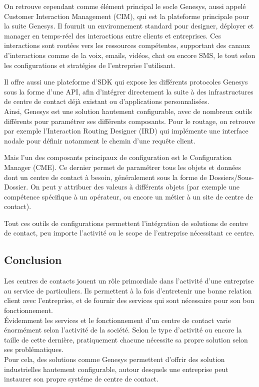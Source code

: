 \documentclass{rapport}
\begin{document}
On retrouve cependant comme élément principal le socle Genesys, aussi appelé Customer Interaction Management (CIM), qui est la plateforme principale pour la suite Genesys. Il fournit un environnement standard pour designer, déployer et manager en temps-réel des interactions entre clients et entreprises.
Ces interactions sont routées vers les ressources compétentes, supportant des canaux d'interactions comme de la voix, emails, vidéos, chat ou encore SMS, le tout selon les configurations et stratégies de l'entreprise l'utilisant.

Il offre aussi une plateforme d'SDK qui expose les différents protocoles Genesys sous la forme d'une API, afin d'intégrer directement la suite à des infrastructures de centre de contact déjà existant ou d'applications personnalisées.\\

Ainsi, Genesys est une solution hautement configurable, avec de nombreux outils différents pour paramétrer ses différents composants. Pour le routage, on retrouve par exemple l'Interaction Routing Designer (IRD) qui implémente une interface nodale pour définir notamment le chemin d'une requête client.

Mais l'un des composants principaux de configuration est le Configuration Manager (CME). Ce dernier permet de paramétrer tous les objets et données dont un centre de contact à besoin, généralement sous la forme de Dossiers/Sous-Dossier. On peut y attribuer des valeurs à différents objets (par exemple une compétence spécifique à un opérateur, ou encore un métier à un site de centre de contact).


Tout ces outils de configurations permettent l'intégration de solutions de centre de contact, peu importe l'activité ou le scope de l'entreprise nécessitant ce centre.

\subsection{Conclusion}

Les centres de contacts jouent un rôle primordiale dans l'activité d'une entreprise au service de particuliers. Ils permettent à la fois d'entretenir une bonne relation client avec l'entreprise, et de fournir des services qui sont nécessaire pour son bon fonctionnement.\\
Évidemment les services et le fonctionnement d'un centre de contact varie énormément selon l'activité de la société. Selon le type d'activité ou encore la taille de cette dernière, pratiquement chacune nécessite sa propre solution selon ses problématiques.\\
Pour cela, des solutions comme Genesys permettent d'offrir des solution industrielles hautement configurable, autour desquels une entreprise peut instaurer son propre systéme de centre de contact.
\end{document}
